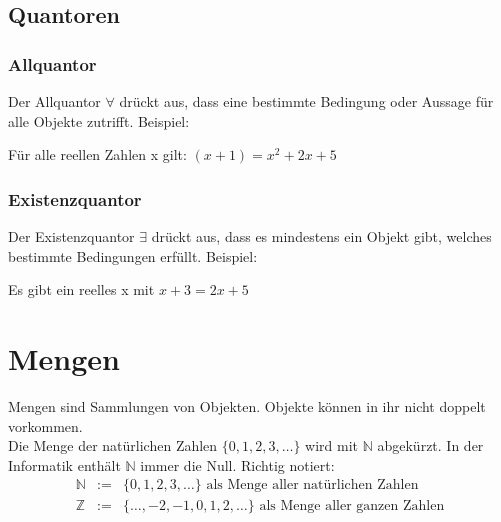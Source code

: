 \documentclass[12pt]{article}
\begin{document}
\subsection{Quantoren}
\subsubsection{Allquantor}
Der Allquantor $\forall$ drückt aus, dass eine bestimmte Bedingung oder Aussage für alle Objekte zutrifft. Beispiel:
\begin{center}
    Für alle reellen Zahlen x gilt: $(x+1)=x^{2}+2x+5$
\end{center}
\subsubsection{Existenzquantor}
Der Existenzquantor $\exists$ drückt aus, dass es mindestens ein Objekt gibt, welches bestimmte Bedingungen erfüllt. Beispiel:
\begin{center}
    Es gibt ein reelles x mit $x+3=2x+5$
\end{center}

\section{Mengen}
Mengen sind Sammlungen von Objekten. Objekte können in ihr nicht doppelt vorkommen. \\
Die Menge der natürlichen Zahlen $\{0,1,2,3,\dots\}$ wird mit $\mathbb{N}$ abgekürzt. In der Informatik enthält $\mathbb{N}$ immer die Null.
Richtig notiert: 
\begin{eqnarray*}
    \mathbb{N}&:=&\{0,1,2,3,\dots\} \text{ als Menge aller natürlichen Zahlen} \\
    \mathbb{Z}&:=&\{\dots,-2,-1,0,1,2,\dots\} \text{ als Menge aller ganzen Zahlen} \\
\end{eqnarray*}
\end{document}
